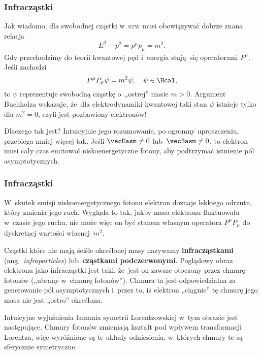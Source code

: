 \documentclass[10pt,t]{beamer}
\begin{document}
\begin{frame}
  \frametitle{Infracząstki}


  Jak wiadomo, dla swobodnej cząstki w~\textsc{stw} musi obowiązywać
  dobrze znana relacja
  \begin{equation}
    \label{eq:Efekt-Casimira-01}
    E^{ 2 } - p^{ 2 } = p^{ \mu } p_{ \mu }  = m^{ 2 }.
  \end{equation}
  Gdy przechodzimy do teorii kwantowej pęd i~energia stają~się operatorami
  $P^{ \mu }$. Jeśli zachodzi
  \begin{equation}
    \label{eq:Efekt-Casimira-01}
    P^{ \mu } P_{ \mu } \psi  = m^{ 2 } \psi, \quad
    \psi \in \Hcal,
  \end{equation}
  to $\psi$ reprezentuje swobodną cząstkę o~„ostrej” masie $m > 0$. Argument
  Buchholza wskazuje, że~dla elektrodynamiki kwantowej taki stan $\psi$
  istnieje tylko dla $m^{ 2 } = 0$, czyli jest pozbawiony elektronów!

  Dlaczego tak jest? Intuicyjnie jego rozumowanie, po ogromny uproszczeniu,
  przebiega mniej więcej tak. Jeśli $\vecEasm \neq 0$ lub~$\vecBasm \neq 0$, to
  elektron musi cały czas emitować niskoenergetyczne fotony, aby podtrzymać
  istnienie pól asymptotycznych.

\end{frame}





\begin{frame}
  \frametitle{Infracząstki}


  W~skutek emisji niskoenergetycznego fotonu elektron doznaje lekkiego
  odrzutu, który zmienia jego ruch. Wygląda to tak, jakby masa
  elektronu fluktuowała w~czasie jego ruchu, nie może więc on być stanem
  własnym operatora $P^{ \mu } P_{ \mu }$ do dyskretnej wartości
  własnej~$m^{ 2 }$.

  Cząstki które nie mają ściśle określonej masy nazywamy
  \textbf{infracząstkami} (ang.~\textit{infraparticles})
  lub~\textbf{cząstkami podczerwonymi}. Poglądowy obraz elektronu jako
  infracząstki jest taki, że~jest on zawsze otoczony przez chmurę fotonów
  („ubrany w~chmurę fotonów”). Chmura ta jest odpowiedzialna za generowanie
  pól asymptotycznych i~przez to, iż elektron „ciągnie” tę chmurę jego masa
  nie jest „ostro” określona.

  Intuicyjne wyjaśnienia łamania symetrii Lorentzowskiej w~tym obrazie
  jest następujące. Chmury fotonów zmieniają kształt pod wpływem
  transformacji Lorentza, więc wyróżnione są te układy odniesienia,
  w~których chmury te są sferycznie symetryczne.

\end{frame}
\end{document}
